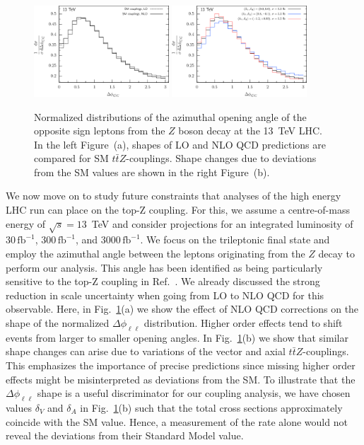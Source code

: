 \documentclass[preprint]{JHEP3} %
\def\ttbZ{t\bar{t}Z}
\def\invfb {\mathrm{fb}^{-1}}
\begin{document}
\begin{figure}[t]
\centering %
\includegraphics[width=0.45\textwidth]{./LHC_53_Fig17a.eps}
\hfill
\includegraphics[width=0.45\textwidth]{./LHC_53_Fig17b.eps}
\caption{\label{fig:v}
Normalized distributions of the azimuthal opening angle of the opposite sign leptons from the $Z$ boson decay at the 13~TeV LHC.
In the left Figure~(a), shapes of LO and NLO QCD predictions are compared for SM $\ttbZ$-couplings.
Shape changes due to deviations from the SM values are shown in the right Figure~(b).
}
\end{figure}



We now move on to study future constraints that analyses of the high energy LHC run can place on the top-Z coupling.
For this, we assume a centre-of-mass energy of $\sqrt{s}=13$~TeV and consider projections for an integrated luminosity of
$30\, \invfb$, $300\, \invfb$, and $3000\, \invfb$. 
We focus on the trileptonic final state and employ the azimuthal angle between the leptons originating
from the $Z$ decay to perform our analysis.
This angle has been identified as being particularly sensitive to the top-Z coupling in Ref.~\cite{baur}.
We already discussed the strong reduction in scale uncertainty when going from LO to NLO QCD for this observable.
Here, in Fig.~\ref{fig:v}(a) we show the effect of NLO QCD corrections on the shape of the normalized $\Delta \phi_{\ell\ell}$ distribution.
Higher order effects tend to shift events from larger to smaller opening angles.
In Fig.~\ref{fig:v}(b) we show that similar shape changes can arise due to variations of the vector and axial $\ttbZ$-couplings.
This emphasizes the importance of precise predictions since missing higher order effects might be misinterpreted as deviations from the SM.
To illustrate that the $\Delta \phi_{\ell\ell}$ shape is a useful discriminator for our coupling analysis, we have chosen 
values $\delta_V$ and $\delta_A$ in Fig.~\ref{fig:v}(b) such that the total cross sections approximately coincide with the SM value.
Hence, a measurement of the rate alone would not reveal the deviations from their Standard Model value.
 
\end{document}
